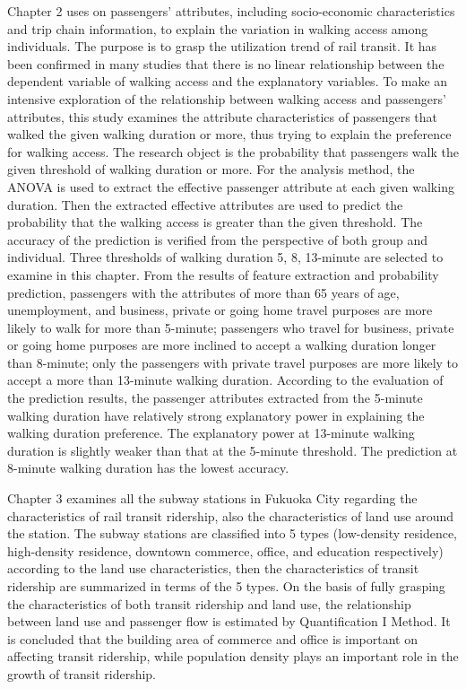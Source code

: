 \documentclass[12pt, twoside, a4paper]{book} %
\begin{document}
Chapter 2 uses on passengers’ attributes, including socio-economic characteristics and trip chain information, to explain the variation in walking access among individuals. The purpose is to grasp the utilization trend of rail transit. It has been confirmed in many studies that there is no linear relationship between the dependent variable of walking access and the explanatory variables. To make an intensive exploration of the relationship between walking access and passengers’ attributes, this study examines the attribute characteristics of passengers that walked the given walking duration or more, thus trying to explain the preference for walking access. The research object is the probability that passengers walk the given threshold of walking duration or more. For the analysis method, the ANOVA is used to extract the effective passenger attribute at each given walking duration. Then the extracted effective attributes are used to predict the probability that the walking access is greater than the given threshold. The accuracy of the prediction is verified from the perspective of both group and individual. Three thresholds of walking duration 5, 8, 13-minute are selected to examine in this chapter. From the results of feature extraction and probability prediction, passengers with the attributes of more than 65 years of age, unemployment, and business, private or going home travel purposes are more likely to walk for more than 5-minute; passengers who travel for business, private or going home purposes are more inclined to accept a walking duration longer than 8-minute; only the passengers with private travel purposes are more likely to accept a more than 13-minute walking duration. According to the evaluation of the prediction results, the passenger attributes extracted from the 5-minute walking duration have relatively strong explanatory power in explaining the walking duration preference. The explanatory power at 13-minute walking duration is slightly weaker than that at the 5-minute threshold. The prediction at 8-minute walking duration has the lowest accuracy.

Chapter 3 examines all the subway stations in Fukuoka City regarding the characteristics of rail transit ridership, also the characteristics of land use around the station. The subway stations are classified into 5 types (low-density residence, high-density residence, downtown commerce, office, and education respectively) according to the land use characteristics, then the characteristics of transit ridership are summarized in terms of the 5 types. On the basis of fully grasping the characteristics of both transit ridership and land use, the relationship between land use and passenger flow is estimated by Quantification I Method. It is concluded that the building area of commerce and office is important on affecting transit ridership, while population density plays an important role in the growth of transit ridership.
\end{document}
